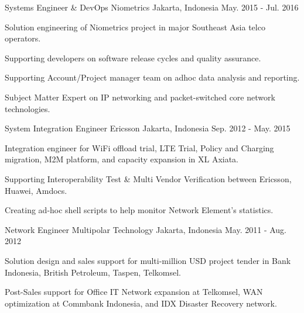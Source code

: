 \begin{cventries}
  \cventry
    {Systems Engineer \& DevOps} %
    {Niometrics} %
    {Jakarta, Indonesia} %
    {May. 2015 - Jul. 2016} %
    {
      \begin{cvitems} %
        \item {Solution engineering of Niometrics project in major Southeast Asia telco operators.}
        \item {Supporting developers on software release cycles and quality assurance.}
        \item {Supporting Account/Project manager team on adhoc data analysis and reporting.}
        \item {Subject Matter Expert on IP networking and packet-switched core network technologies.}
      \end{cvitems}
    }

  \cventry
    {System Integration Engineer} %
    {Ericsson} %
    {Jakarta, Indonesia} %
    {Sep. 2012 - May. 2015} %
    {
      \begin{cvitems} %
        \item {Integration engineer for WiFi offload trial, LTE Trial, Policy and Charging migration, M2M platform, and capacity expansion in XL Axiata.}
        \item {Supporting Interoperability Test \& Multi Vendor Verification between Ericsson, Huawei, Amdocs.}
        \item {Creating ad-hoc shell scripts to help monitor Network Element's statistics.}
      \end{cvitems}
    }

  \cventry
    {Network Engineer} %
    {Multipolar Technology} %
    {Jakarta, Indonesia} %
    {May. 2011 - Aug. 2012} %
    {
      \begin{cvitems} %
        \item {Solution design and sales support for multi-million USD project tender in Bank Indonesia, British Petroleum, Taspen, Telkomsel.}
        \item {Post-Sales support for Office IT Network expansion at Telkomsel, WAN optimization at Commbank Indonesia, and IDX Disaster Recovery network.}
      \end{cvitems}
    }


\end{cventries}
